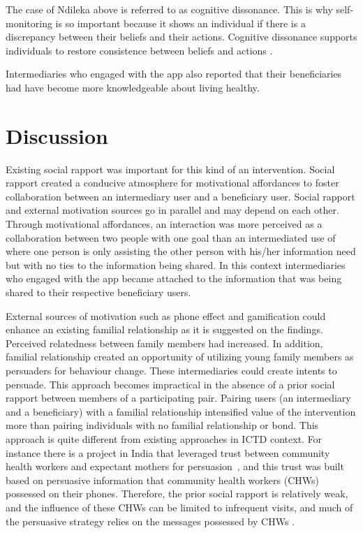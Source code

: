 The case of Ndileka above is referred to as cognitive dissonance. This is why self-monitoring is so important because it shows an individual if there is a discrepancy between their beliefs and their actions. Cognitive dissonance supports individuals to restore consistence between beliefs and actions \citep{Oinas-kukkonen:psd}.

Intermediaries who engaged with the app also reported that their beneficiaries had have become more knowledgeable about living healthy. 
\section{Discussion}
Existing social rapport was important for this kind of an intervention. Social rapport created a conducive atmosphere for motivational affordances to foster collaboration between an intermediary user and a beneficiary user. Social rapport and external motivation sources go in parallel and may depend on each other. Through motivational affordances, an interaction was more perceived as a collaboration between two people with one goal than an intermediated use of where one person is only assisting the other person with his/her information need but with no ties to the information being shared. In this context intermediaries who engaged with the app became attached to the information that was being shared to their respective beneficiary users.

External sources of motivation such as phone effect and gamification could enhance an existing familial relationship as it is suggested on the findings. Perceived relatedness between family members had increased. In addition, familial relationship created an opportunity of utilizing young family members as persuaders for behaviour change. These intermediaries could create intents to persuade. This approach becomes impractical in the absence of a prior social rapport between members of a participating pair. Pairing users (an intermediary and a beneficiary) with a familial relationship intensified value of the intervention more than pairing individuals with no familial relationship or bond. This approach is quite different from existing approaches in ICTD context.  For instance there is a project in India that leveraged trust between community health workers and expectant mothers for  persuasion~\citep{ramachandran2010mobile,ramachandran2010research}, and this trust was built based on persuasive information that community health workers (CHWs) possessed on their phones. Therefore, the prior social rapport is relatively weak, and the  influence of these CHWs can be limited to infrequent visits, and much of the persuasive strategy relies on the messages possessed by CHWs \citep{katule2016leveraging}.  

